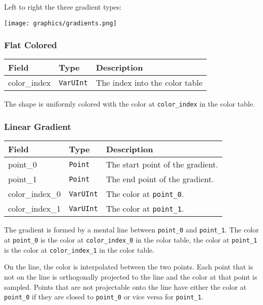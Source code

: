 \documentclass[]{article}
\begin{document}
Left to right the three gradient types:

\begin{center}
\texttt{[image: graphics/gradients.png]}
\end{center}

\hypertarget{flat-colored}{\subsubsection{Flat Colored}\label{flat-colored}}

\begin{longtable}[]{@{}p{1in}p{1in}p{4in}@{}}
\toprule
Field & Type & Description \\
\midrule
\endhead
color\_index & \texttt{VarUInt} & The index into the color table \\
\bottomrule
\end{longtable}

The shape is uniformly colored with the color at \texttt{color\_index}
in the color table.

\hypertarget{linear-gradient}{\subsubsection{Linear Gradient}\label{linear-gradient}}

\begin{longtable}[]{@{}p{1in}p{1in}p{4in}@{}}
\toprule
Field & Type & Description \\
\midrule
\endhead
point\_0        & \texttt{Point}   & The start point of the gradient. \\
point\_1        & \texttt{Point}   & The end point of the gradient. \\
color\_index\_0 & \texttt{VarUInt} & The color at \texttt{point\_0}. \\
color\_index\_1 & \texttt{VarUInt} & The color at \texttt{point\_1}. \\
\bottomrule
\end{longtable}

The gradient is formed by a mental line between \texttt{point\_0} and
\texttt{point\_1}. The color at \texttt{point\_0} is the color at
\texttt{color\_index\_0} in the color table, the color at
\texttt{point\_1} is the color at \texttt{color\_index\_1} in the color
table.

On the line, the color is interpolated between the two points.
Each point that is not on the line is orthogonally projected to the line
and the color at that point is sampled. Points that are not projectable
onto the line have either the color at \texttt{point\_0} if they are
closed to \texttt{point\_0} or vice versa for \texttt{point\_1}.
\end{document}
